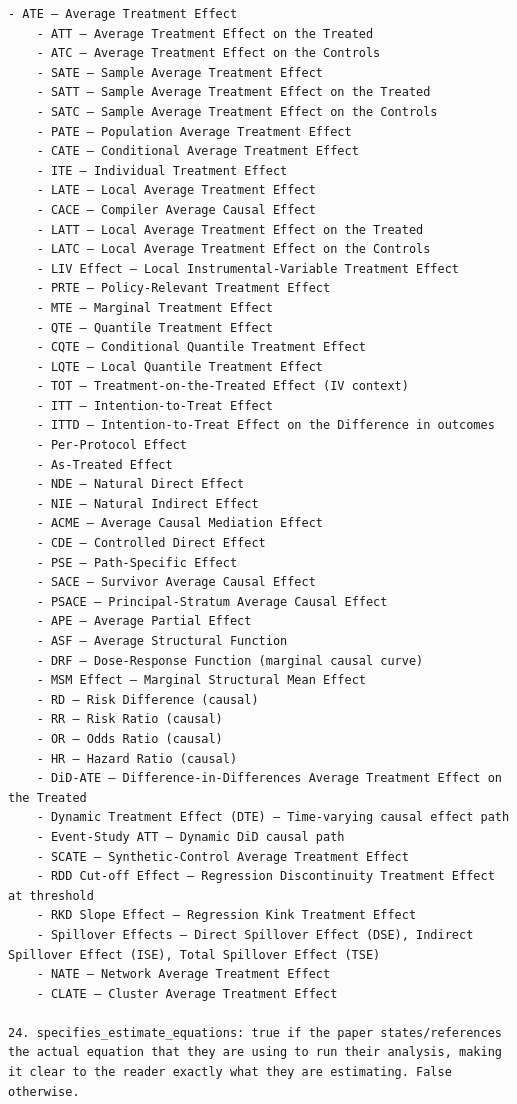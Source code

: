\documentclass[12pt]{article}
\begin{document}
{\begin{Verbatim}[breaklines=true]
    - ATE – Average Treatment Effect
    - ATT – Average Treatment Effect on the Treated
    - ATC – Average Treatment Effect on the Controls
    - SATE – Sample Average Treatment Effect
    - SATT – Sample Average Treatment Effect on the Treated
    - SATC – Sample Average Treatment Effect on the Controls
    - PATE – Population Average Treatment Effect
    - CATE – Conditional Average Treatment Effect
    - ITE – Individual Treatment Effect
    - LATE – Local Average Treatment Effect
    - CACE – Compiler Average Causal Effect
    - LATT – Local Average Treatment Effect on the Treated
    - LATC – Local Average Treatment Effect on the Controls
    - LIV Effect – Local Instrumental-Variable Treatment Effect
    - PRTE – Policy-Relevant Treatment Effect
    - MTE – Marginal Treatment Effect
    - QTE – Quantile Treatment Effect
    - CQTE – Conditional Quantile Treatment Effect
    - LQTE – Local Quantile Treatment Effect
    - TOT – Treatment-on-the-Treated Effect (IV context)
    - ITT – Intention-to-Treat Effect
    - ITTD – Intention-to-Treat Effect on the Difference in outcomes
    - Per-Protocol Effect
    - As-Treated Effect
    - NDE – Natural Direct Effect
    - NIE – Natural Indirect Effect
    - ACME – Average Causal Mediation Effect
    - CDE – Controlled Direct Effect
    - PSE – Path-Specific Effect
    - SACE – Survivor Average Causal Effect
    - PSACE – Principal-Stratum Average Causal Effect
    - APE – Average Partial Effect
    - ASF – Average Structural Function
    - DRF – Dose-Response Function (marginal causal curve)
    - MSM Effect – Marginal Structural Mean Effect
    - RD – Risk Difference (causal)
    - RR – Risk Ratio (causal)
    - OR – Odds Ratio (causal)
    - HR – Hazard Ratio (causal)
    - DiD-ATE – Difference-in-Differences Average Treatment Effect on the Treated
    - Dynamic Treatment Effect (DTE) – Time-varying causal effect path
    - Event-Study ATT – Dynamic DiD causal path
    - SCATE – Synthetic-Control Average Treatment Effect
    - RDD Cut-off Effect – Regression Discontinuity Treatment Effect at threshold
    - RKD Slope Effect – Regression Kink Treatment Effect
    - Spillover Effects – Direct Spillover Effect (DSE), Indirect Spillover Effect (ISE), Total Spillover Effect (TSE)
    - NATE – Network Average Treatment Effect
    - CLATE – Cluster Average Treatment Effect

24. specifies_estimate_equations: true if the paper states/references the actual equation that they are using to run their analysis, making it clear to the reader exactly what they are estimating. False otherwise.


\end{Verbatim}}
\end{document}
